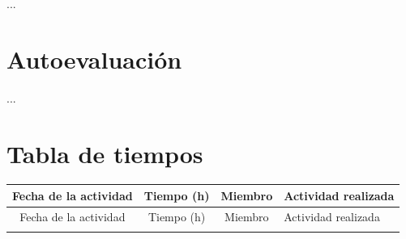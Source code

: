 \documentclass[a4paper]{article}
\begin{document}
...

\section{Autoevaluación}

...

\section{Tabla de tiempos}

\begin{longtable}{|c|c|c|>{\centering\arraybackslash}p{}|}
\hline
\rowcolor{gray!20}
Fecha de la actividad
& Tiempo (h)
& Miembro
& Actividad realizada
\\\hline
\endfirsthead

\hline
\rowcolor{gray!20}
Fecha de la actividad
& Tiempo (h)
& Miembro
& Actividad realizada
\\\hline
\endhead

\hline
\endfoot

\hline
\endlastfoot


\end{longtable}
\end{document}
